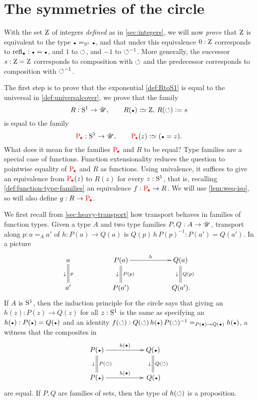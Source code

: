 \section{The symmetries of the circle}
\label{sec:pi1S1isZ}\label{sec:symcirc}

With the set $\mathrm{Z}$ of integers \emph{defined} as in \cref{sec:integers}, 
we will now \emph{prove} that $\mathrm{Z}$ is equivalent to the type 
$\base=_{\Sc}\base$, and that under this equivalence $0:\mathrm{Z}$ corresponds to 
$\refl{\base}:\base=\base$, and $1$ to $\circlearrowleft$, and $-1$ to $\circlearrowleft^{-1}$. 
More generally, the successor ${s}:\mathrm{Z}=\mathrm{Z}$ corresponds to composition with $\circlearrowleft$
and the predecessor corresponds to composition with $\circlearrowleft^{-1}$.

The first step is to prove that the exponential \covering \cref{def:RtoS1} 
is equal to the universal \covering in \cref{def:universalcover}, 
\ie we prove that the family 
\[
R: \Sc\to\UU,\qquad R(\base)\defeq\zet,\, R(\Sloop)\defis \etop{s}
\]
is equal to the family
\[
\uc{\base}:\Sc\to\UU,\qquad \uc{\base}(z)\defeq (\base=z).
\]
What does it mean for the families $\uc{\base}$ and $R$ to be equal?
Type families are a special case of functions. 
Function extensionality reduces the question to pointwise equality
of $\uc{\base}$ and $R$ as functions.
Using univalence, it suffices to give
an equivalence from $\uc{\base}(z)$ to $R(z)$ for every $z:{\mathrm{S}^1}$,
that is, recalling \cref{def:function-type-families}
an equivalence $f: \uc{\base}\to R$. We will use
\cref{lem:weq-iso}, so will also define $g: R\to\uc{\base}$.

We first recall from \cref{sec:heavy-transport} how 
transport behaves in families of function types.  
Given a type $A$ and two type families $P,Q:A\to{\mathscr{U}}$,  
transport along $p:a=_Aa'$ of $h:P(a)\to Q(a)$ is $Q(p)\,h\,P(p)^{-1}:P(a')=Q(a')$.
In a picture
\[
\xymatrix{
a\ar@{=}[d]^{p}_\downarrow &&
P(a)\ar[rr]^{h}\ar@{=}[d]^{P(p)}_\downarrow&&
Q(a)\ar@{=}[d]^{Q(p)}_\downarrow\\
a'&&P(a')&&\,Q(a').}
\]
If $A$ is ${\mathrm{S}^1}$, then the induction principle for the circle says 
that giving an $h(z):P(z)\to Q(z)$ for all $z:{\mathrm{S}^1}$ is the same as 
specifying an $h(\base):P(\base)=Q(\base)$ and an identity 
$f(\Sloop):Q(\Sloop)\,h(\base)\,P(\Sloop)^{-1}=_{P(\base)\to Q(\base)}h(\base)$,
\ie   a witness that the composites in 
$$\xymatrix{
  P(\base)\ar[rr]^{h(\base)}\ar@{=}[d]^{P(\Sloop)}_\downarrow
 &&Q(\base)\ar@{=}[d]^{Q(\Sloop)}_\downarrow\\
  P(\base)\ar[rr]^{h(\base)}&&\,Q(\base)}
$$
are equal. If $P,Q$ are families of sets, 
then the type of $h(\circlearrowleft)$ is a proposition.

